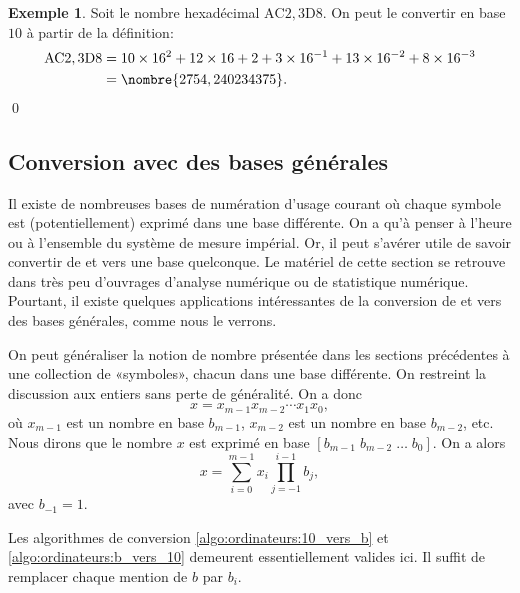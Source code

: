 \documentclass[letterpaper,11pt,english,french]{memoir}
\theoremstyle{plain}
\theoremstyle{definition}
\newtheorem{exemple}{Exemple}[chapter]
\theoremstyle{remark}
\begin{document}
\begin{exemple}
  Soit le nombre hexadécimal $\mathrm{AC}2,3\mathrm{D}8$. On peut le
  convertir en base $10$ à partir de la définition:
  \begin{align*}
    \mathrm{AC}2,3\mathrm{D}8
    &= 10 \times 16^2 + 12 \times 16 + 2 + 3 \times 16^{-1} + 13
    \times 16^{-2} + 8 \times 16^{-3} \\
    &= \nombre{2754,240234375}.
  \end{align*}
  \qed
\end{exemple}


\subsection{Conversion avec des bases générales}
\label{sec:ordinateurs:conversion:bases_generales}

Il existe de nombreuses bases de numération d'usage courant où chaque
symbole est (potentiellement) exprimé dans une base différente. On a
qu'à penser à l'heure ou à l'ensemble du système de mesure impérial.
Or, il peut s'avérer utile de savoir convertir de et vers une base
quelconque. Le matériel de cette section se retrouve dans très peu
d'ouvrages d'analyse numérique ou de statistique numérique. Pourtant,
il existe quelques applications intéressantes de la conversion de et
vers des bases générales, comme nous le verrons.

On peut généraliser la notion de nombre présentée dans les sections
précédentes à une collection de «symboles», chacun dans une base
différente. On restreint la discussion aux entiers sans perte de
généralité. On a donc
\begin{displaymath}
  x = x_{m-1}x_{m-2} \cdots x_1x_0,
\end{displaymath}
où $x_{m - 1}$ est un nombre en base $b_{m - 1}$, $x_{m - 2}$ est un
nombre en base $b_{m - 2}$, etc. Nous dirons que le nombre $x$ est
exprimé en base $[b_{m - 1}\; b_{m - 2}\; \dots\; b_0]$. On a alors
\begin{equation}
  \label{eq:ordinateurs:def_base_gen}
  x = \sum_{i = 0}^{m - 1} x_i \prod_{j = -1}^{i - 1} b_j,
\end{equation}
avec $b_{-1} = 1$.

Les algorithmes de conversion \ref{algo:ordinateurs:10_vers_b} et
\ref{algo:ordinateurs:b_vers_10} demeurent essentiellement valides
ici. Il suffit de remplacer chaque mention de $b$ par $b_i$.
\end{document}
